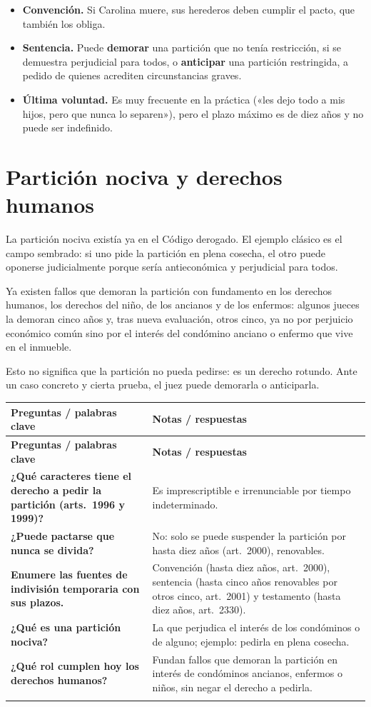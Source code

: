 \documentclass[12pt,oneside]{book}
\makeatletter
\renewcommand{\arraystretch}{1.25}
\newcommand{\cq}[2]{\textbf{#1} & #2 \\[0.45em]}
\newcommand{\cornell}[3]{%
\par\bigskip\noindent{\large\bfseries Cuadro Cornell: #1}\par\nopagebreak\smallskip
\begingroup
\small
\renewcommand{\arraystretch}{1.15}
\begin{longtable}{@{}>{\raggedright\arraybackslash}p{0.26\textwidth}>{\raggedright\arraybackslash}p{0.66\textwidth}@{}}
\toprule
\textbf{Preguntas / palabras clave} & \textbf{Notas / respuestas} \\
\midrule
\endfirsthead
\toprule
\textbf{Preguntas / palabras clave} & \textbf{Notas / respuestas} \\
\midrule
\endhead
#2
\midrule
\multicolumn{2}{@{}p{\dimexpr0.92\textwidth+2\tabcolsep\relax}@{}}{\vspace{0.2em}\textbf{Resumen.} #3\vspace{0.2em}} \\
\bottomrule
\end{longtable}
\endgroup
}
\makeatother
\begin{document}
\begin{itemize}
    \item \textbf{Convención.} Si Carolina muere, sus herederos deben cumplir el pacto, que también los obliga.
    \item \textbf{Sentencia.} Puede \textbf{demorar} una partición que no tenía restricción, si se demuestra perjudicial para todos, o \textbf{anticipar} una partición restringida, a pedido de quienes acrediten circunstancias graves.
    \item \textbf{Última voluntad.} Es muy frecuente en la práctica («les dejo todo a mis hijos, pero que nunca lo separen»), pero el plazo máximo es de diez años y no puede ser indefinido.
\end{itemize}

\section{Partición nociva y derechos humanos}

La partición nociva existía ya en el Código derogado. El ejemplo clásico es el campo sembrado: si uno pide la partición en plena cosecha, el otro puede oponerse judicialmente porque sería antieconómica y perjudicial para todos.

\begin{importante}
Ya existen fallos que demoran la partición con fundamento en los derechos humanos, los derechos del niño, de los ancianos y de los enfermos: algunos jueces la demoran cinco años y, tras nueva evaluación, otros cinco, ya no por perjuicio económico común sino por el interés del condómino anciano o enfermo que vive en el inmueble.
\end{importante}

Esto no significa que la partición no pueda pedirse: es un derecho rotundo. Ante un caso concreto y cierta prueba, el juez puede demorarla o anticiparla.

\cornell{partición e indivisión}{
\cq{¿Qué caracteres tiene el derecho a pedir la partición (arts.~1996 y 1999)?}{Es imprescriptible e irrenunciable por tiempo indeterminado.}
\cq{¿Puede pactarse que nunca se divida?}{No: solo se puede suspender la partición por hasta diez años (art.~2000), renovables.}
\cq{Enumere las fuentes de indivisión temporaria con sus plazos.}{Convención (hasta diez años, art.~2000), sentencia (hasta cinco años renovables por otros cinco, art.~2001) y testamento (hasta diez años, art.~2330).}
\cq{¿Qué es una partición nociva?}{La que perjudica el interés de los condóminos o de alguno; ejemplo: pedirla en plena cosecha.}
\cq{¿Qué rol cumplen hoy los derechos humanos?}{Fundan fallos que demoran la partición en interés de condóminos ancianos, enfermos o niños, sin negar el derecho a pedirla.}
}{La partición puede pedirse siempre salvo indivisión forzosa, que solo la ley establece, con fuentes convencional, judicial o testamentaria de plazo máximo diez o cinco años. La partición nociva y los derechos humanos permiten demorarla o anticiparla según el caso.}
\end{document}
